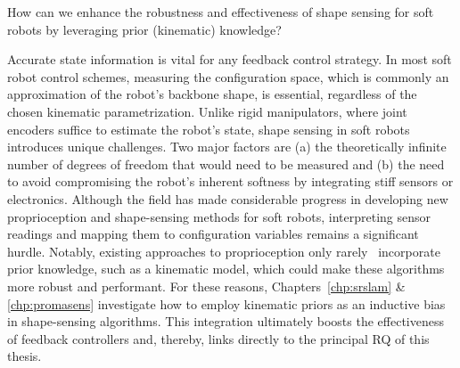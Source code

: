 \begin{researchquestion}\label{rq:shape_sensing}
    How can we enhance the robustness and effectiveness of shape sensing for soft robots by leveraging prior (kinematic) knowledge?
\end{researchquestion}
Accurate state information is vital for any feedback control strategy. In most soft robot control schemes, measuring the configuration space, which is commonly an approximation of the robot’s backbone shape, is essential, regardless of the chosen kinematic parametrization. Unlike rigid manipulators, where joint encoders suffice to estimate the robot’s state, shape sensing in soft robots introduces unique challenges. Two major factors are (a) the theoretically infinite number of degrees of freedom that would need to be measured and (b) the need to avoid compromising the robot’s inherent softness by integrating stiff sensors or electronics.
%
Although the field has made considerable progress in developing new proprioception and shape-sensing methods for soft robots, interpreting sensor readings and mapping them to configuration variables remains a significant hurdle. Notably, existing approaches to proprioception only rarely~\citep{stella2023soft} incorporate prior knowledge, such as a kinematic model, which could make these algorithms more robust and performant.
%
For these reasons, Chapters~\ref{chp:srslam} \& \ref{chp:promasens} investigate how to employ kinematic priors as an inductive bias in shape-sensing algorithms. This integration ultimately boosts the effectiveness of feedback controllers and, thereby, links directly to the principal \gls{RQ} of this thesis.

